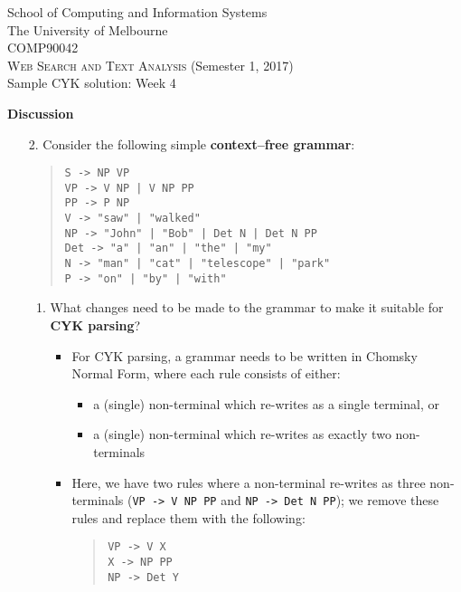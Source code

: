 \documentclass[a4paper]{article}
\begin{document}
\begin{center}
\Large{School of Computing and Information Systems}\\
\Large{The University of Melbourne}\\
\Large{COMP90042}\\
\Large{\textsc{Web Search and Text Analysis} (Semester 1, 2017)}\\[1ex]
\large{Sample CYK solution: Week 4}
\end{center}

\large{\textbf{Discussion}}
\begin{enumerate}
\item [2.] Consider the following simple \textbf{context--free grammar}:
\begin{quote}
\texttt{S -> NP VP}\\
\texttt{VP -> V NP | V NP PP}\\
\texttt{PP -> P NP}\\
\texttt{V -> "saw" | "walked"}\\
\texttt{NP -> "John" | "Bob" | Det N | Det N PP}\\
\texttt{Det -> "a" | "an" | "the" | "my"}\\
\texttt{N -> "man" | "cat" | "telescope" | "park"}\\
\texttt{P -> "on" | "by" | "with"}
\end{quote}
\begin{enumerate}
\item What changes need to be made to the grammar to make it suitable for \textbf{CYK parsing}?
\begin{itemize}
\item For CYK parsing, a grammar needs to be written in Chomsky Normal Form, where each rule consists of either:
\begin{itemize}
\item a (single) non-terminal which re-writes as a single terminal, or
\item a (single) non-terminal which re-writes as exactly two non-terminals
\end{itemize}
\item Here, we have two rules where a non-terminal re-writes as three non-terminals (\texttt{VP -> V NP PP} and \texttt{NP -> Det N PP}); we remove these rules and replace them with the following:
\begin{quote}
\texttt{VP -> V X}\\
\texttt{X -> NP PP}\\
\texttt{NP -> Det Y}\\

\end{quote}
\end{itemize}
\end{enumerate}
\end{enumerate}
\end{document}
